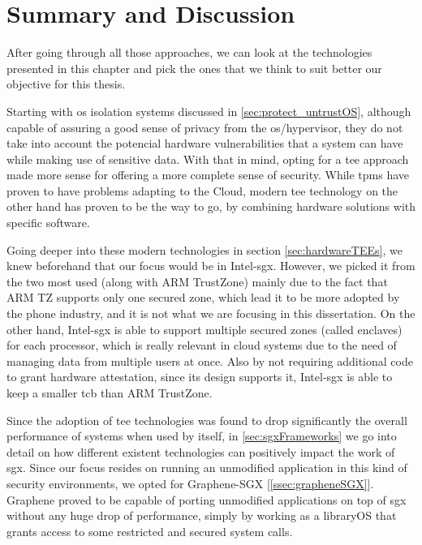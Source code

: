 \section{Summary and Discussion}
\label{sec:summary}


After going through all those approaches, we can look at the technologies presented in this chapter and pick the ones that we think to suit better our objective for this thesis. 

Starting with \gls{os} isolation systems discussed in \ref{sec:protect_untrustOS}, although capable of assuring a good sense of privacy from the \gls{os}/hypervisor, they do not take into account the potencial hardware vulnerabilities that a system can have while making use of sensitive data. 
With that in mind, opting for a \gls{tee} approach made more sense for offering a more complete sense of security.
While \gls{tpm}s have proven to have problems adapting to the Cloud, modern \gls{tee} technology on the other hand has proven to be the way to go, by combining hardware solutions with specific software.

Going deeper into these modern technologies in section \ref{sec:hardwareTEEs}, we knew beforehand that our focus would be in Intel-\gls{sgx}. However, we picked it from the two most used (along with ARM TrustZone) mainly due to the fact that ARM TZ supports only one secured zone, which lead it to be more adopted by the phone industry, and it is not what we are focusing in this dissertation. On the other hand, Intel-\gls{sgx} is able to support multiple secured zones (called enclaves) for each processor, which is really relevant in cloud systems due to the need of managing data from multiple users at once.
Also by not requiring additional code to grant hardware attestation, since its design supports it, Intel-\gls{sgx} is able to keep a smaller \gls{tcb} than ARM TrustZone.

Since the adoption of \gls{tee} technologies was found to drop significantly the overall performance of systems when used by itself, in \ref{sec:sgxFrameworks} we go into detail on how different existent technologies can positively impact the work of \gls{sgx}. Since our focus resides on running an unmodified application in this kind of security environments, we opted for Graphene-SGX [\ref{ssec:grapheneSGX}]. Graphene proved to be capable of porting unmodified applications on top of \gls{sgx} without any huge drop of performance, simply by working as a libraryOS that grants access to some restricted and secured system calls.








